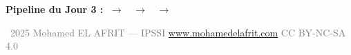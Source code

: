 \separateur

\begin{center}
    \small\sffamily
    \textbf{Pipeline du Jour 3 :}\quad
    $\;\longrightarrow\;$
    $\;\longrightarrow\;$
    $\;\longrightarrow\;$
\end{center}

\vfill

\begin{center}
    {\footnotesize\sffamily\textcolor{gray}{%
        \textcopyright\ 2025 Mohamed EL AFRIT --- IPSSI \enspace\textbullet\enspace
        \url{www.mohamedelafrit.com} \enspace\textbullet\enspace
        CC BY-NC-SA 4.0
    }}
\end{center}


